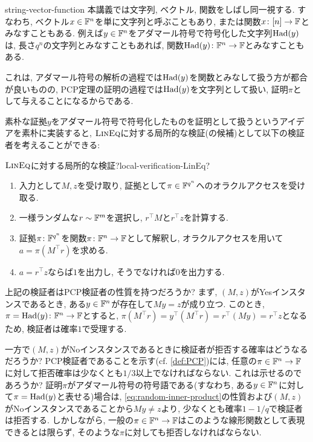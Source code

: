 \begin{remark}{}{string-vector-function}
  本講義では文字列, ベクトル, 関数をしばし同一視する.
  すなわち, ベクトル$x\in\mathbb{F}^n$を単に文字列と呼ぶこともあり,
  または関数$x\colon [n]\to\mathbb{F}$とみなすこともある.
  例えば$y\in\mathbb{F}^n$をアダマール符号で符号化した文字列$\mathrm{Had}(y)$は, 長さ$q^n$の文字列とみなすこともあれば,
  関数$\mathrm{Had}(y)\colon \mathbb{F}^n\to\mathbb{F}$とみなすこともある.

  これは, アダマール符号の解析の過程では$\mathrm{Had}(y)$を関数とみなして扱う方が都合が良いものの,
  PCP定理の証明の過程では$\mathrm{Had}(y)$を文字列として扱い, 証明$\pi$として与えることになるからである.
\end{remark}

素朴な証拠$y$をアダマール符号で符号化したものを証明として扱うというアイデアを素朴に実装すると, $\textsc{LinEq}$に対する局所的な検証(の候補)として以下の検証者を考えることができる:
\begin{algorithm}{$\textsc{LinEq}$に対する局所的な検証?}{local-verification-LinEq?}
  \begin{enumerate}
  \item 入力として$M,z$を受け取り, 証拠として$\pi \in \mathbb{F}^{q^n}$へのオラクルアクセスを受け取る.
  \item 一様ランダムな$r\sim\mathbb{F}^m$を選択し, $r^\top M$と$r^\top z$を計算する.
  \item 証拠$\pi\colon \mathbb{F}^{q^n}$を関数$\pi\colon \mathbb{F}^n\to \mathbb{F}$として解釈し, オラクルアクセスを用いて$a=\pi(M^\top r)$を求める.
  \item $a=r^\top z$ならば$1$を出力し, そうでなければ$0$を出力する.
  \end{enumerate}
\end{algorithm}

上記の検証者はPCP検証者の性質を持つだろうか?
まず, $(M,z)$がYesインスタンスであるとき, ある$y\in\mathbb{F}^n$が存在して$My=z$が成り立つ.
このとき, $\pi=\mathrm{Had}(y)\colon\mathbb{F}^n\to\mathbb{F}$とすると, $\pi(M^\top r)=y^\top (M^\top r)=r^\top (My)=r^\top z$となるため, 検証者は確率$1$で受理する.

一方で$(M,z)$がNoインスタンスであるときに検証者が拒否する確率はどうなるだろうか?
PCP検証者であることを示す(cf. \cref{def:PCP})には, 任意の$\pi\in\mathbb{F}^n\to\mathbb{F}$に対して拒否確率は少なくとも$1/3$以上でなければならない.
これは示せるのであろうか?
証明$\pi$がアダマール符号の符号語である(すなわち, ある$y\in\mathbb{F}^n$に対して$\pi = \mathrm{Had}(y)$と表せる)場合は, \cref{eq:random-inner-product}の性質および$(M,z)$がNoインスタンスであることから$My\ne z$より, 少なくとも確率$1-1/q$で検証者は拒否する.
しかしながら, 一般の$\pi\in\mathbb{F}^n\to\mathbb{F}$はこのような線形関数として表現できるとは限らず, そのような$\pi$に対しても拒否しなければならない.

